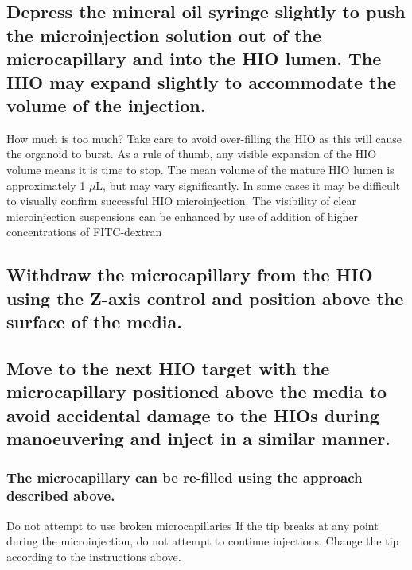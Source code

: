 \documentclass[11pt]{article}
\begin{document}
\subsection{{\bfseries\sffamily } Depress the mineral oil syringe slightly to push the microinjection solution out of the microcapillary and into the HIO lumen. The HIO may expand slightly to accommodate the volume of the injection.}
\label{sec:orgheadline52}
\begin{bclogo}[logo=\bcinfo, couleurBarre=Black, noborder=true, couleur=gray!10]{     How much is too much?}
Take care to avoid over-filling the HIO as this will cause the organoid to burst. As a rule of thumb, any visible expansion of the HIO volume means it is time to stop. The mean volume of the mature HIO lumen is approximately 1 \(\mu\)L, but may vary significantly. In some cases it may be difficult to visually confirm successful HIO microinjection. The visibility of clear microinjection suspensions can be enhanced by use of addition of higher concentrations of FITC-dextran\\
\end{bclogo}
\subsection{{\bfseries\sffamily } Withdraw the microcapillary from the HIO using the Z-axis control and position above the surface of the media.}
\label{sec:orgheadline53}
\subsection{{\bfseries\sffamily } Move to the next HIO target with the microcapillary positioned above the media to avoid accidental damage to the HIOs during manoeuvering and inject in a similar manner.}
\label{sec:orgheadline55}
\subsubsection{{\bfseries\sffamily } The microcapillary can be re-filled using the approach described above.}
\label{sec:orgheadline54}
\begin{bclogo}[logo=\bcinfo, couleurBarre=Black, noborder=true, couleur=gray!10]{     Do not attempt to  use broken microcapillaries}
If the tip breaks at any point during the microinjection, do not attempt to continue injections. Change the tip according to the instructions above.\\
\end{bclogo}
\end{document}
